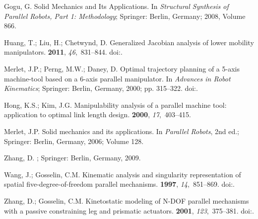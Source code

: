 \documentclass[robotics,article,accept,moreauthors,pdftex]{Definitions/mdpi}
\begin{document}
\begin{thebibliography}{999}
Gogu, G.
\newblock Solid Mechanics and Its Applications. In {\em Structural Synthesis of Parallel Robots, Part 1: Methodology}; Springer: Berlin, Germany; 2008, Volume 866.

Huang, T.; Liu, H.; Chetwynd, D.
\newblock Generalized Jacobian analysis of lower mobility manipulators.
 {\bf 2011}, {\em 46},~831--844.
\newblock
  doi:{\href{https://doi.org/10.1016/j.mechmachtheory.2011.01.009}{}}.

Merlet, J.P.; Perng, M.W.; Daney, D.
\newblock Optimal trajectory planning of a 5-axis machine-tool based on a
  6-axis parallel manipulator. In {\em Advances in Robot Kinematics}; Springer: Berlin, Germany, 2000; pp. 315--322.
\newblock
  doi:{\href{https://doi.org/10.1007/978-94-011-4120-8_33}{}}.

Hong, K.S.; Kim, J.G.
\newblock Manipulability analysis of a parallel machine tool: application to
  optimal link length design.
 {\bf 2000}, {\em 17},~403--415.

Merlet, J.P.
\newblock Solid mechanics and its applications. In {\em Parallel Robots}, 2nd ed.;  Springer: Berlin, Germany, 2006; Volume 128.

Zhang, D.
; Springer: Berlin, Germany, 2009.

Wang, J.; Gosselin, C.M.
\newblock Kinematic analysis and singularity representation of spatial
  five-degree-of-freedom parallel mechanisms.
 {\bf 1997}, {\em 14},~851--869.
\newblock
  doi:{\href{https://doi.org/10.1002/(SICI)1097-4563(199712)14:12<851::AID-ROB3>3.0.CO;2-T}{}}.

Zhang, D.; Gosselin, C.M.
\newblock Kinetostatic modeling of N-DOF parallel mechanisms with a passive
  constraining leg and prismatic actuators.
 {\bf 2001}, {\em 123},~375--381.
\newblock
  doi:{\href{https://doi.org/10.1115/1.1370976}{}}.


\end{thebibliography}
\end{document}
